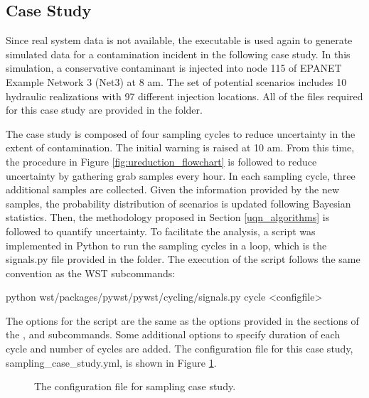 \subsection{Case Study}
Since real system data is not available, the 
executable is used again to generate simulated data for a contamination incident in the following case study.  In this simulation, 
a conservative contaminant is injected into node 115 of EPANET
Example Network 3 (Net3) at 8 am.  The set of potential scenarios includes 10 hydraulic realizations with 97 different injection locations. All of the files required 
for this case study are provided in the  folder.
  
The case study is composed of four sampling cycles to reduce uncertainty in the extent of contamination. The initial warning is 
raised at 10 am. From this time, the procedure in Figure \ref{fig:ureduction_flowchart} is followed to reduce uncertainty by gathering 
grab samples every hour. In each sampling cycle, three additional samples are collected. Given the information provided by the new samples, 
the probability distribution of scenarios is updated following Bayesian statistics. Then, the methodology proposed in Section \ref{uqn_algorithms} 
is followed to quantify uncertainty. To facilitate the analysis, a script was implemented in Python to run the sampling cycles in a loop, which is the signals.py file provided in the  folder. 
The execution of the script follows the same convention as the WST subcommands:

\begin{unknownListing}
python wst/packages/pywst/pywst/cycling/signals.py cycle <configfile>
\end{unknownListing}

The options for the script are the same as the options provided in the sections of the ,  and  subcommands. 
Some additional options to specify duration of each cycle and number of cycles are added. The configuration file for this case study, sampling\_case\_study.yml, 
is shown in Figure \ref{fig:case_study_conf}.  

\begin{figure}[!ht]
  \caption{The configuration file for sampling case study.}
  \label{fig:case_study_conf}
\end{figure}

